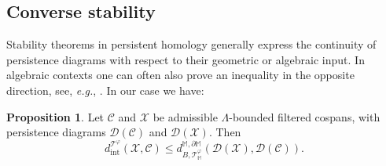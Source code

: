 \documentclass[11pt]{amsart}
\theoremstyle{definition}
\newtheorem{prop}[theorem]{Proposition}
\theoremstyle{remark}
\numberwithin{equation}{section}
\begin{document}
\subsection{Converse stability}

Stability theorems in persistent homology generally express the continuity of persistence diagrams with respect to their geometric or algebraic input. In algebraic contexts one can often also prove an inequality in the opposite direction, see, \emph{e.g.}, \cite[Section 8]{BL}.   In our case we have:

\begin{prop}\label{convstab}
	Let $\mathcal{C}$ and $\mathcal{X}$ be admissible $\Lambda$-bounded filtered cospans, with persistence diagrams $\mathcal{D}(\mathcal{C})$ and $\mathcal{D}(\mathcal{X})$.  Then \[ d_{\mathrm{int}}^{\mathcal{T}^{\varphi}}(\mathcal{X},\mathcal{C})\leq d_{B,\mathcal{T}_{\mathbb{M}}^{\varphi}}^{\mathbb{M},\partial\mathbb{M}}(\mathcal{D}(\mathcal{X}),\mathcal{D}(\mathcal{C})).  \]
\end{prop}
\end{document}

